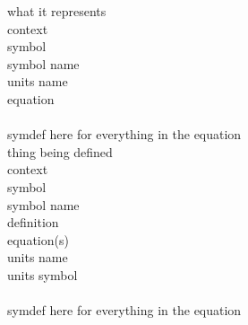 what it represents \\
context \\
symbol \\
symbol name \\
units name \\
equation \\
\\
symdef here for everything in the equation \\


thing being defined \\
context \\
symbol \\
symbol name \\
definition \\
equation(s) \\
units name \\
units symbol \\
\\
symdef here for everything in the equation \\
